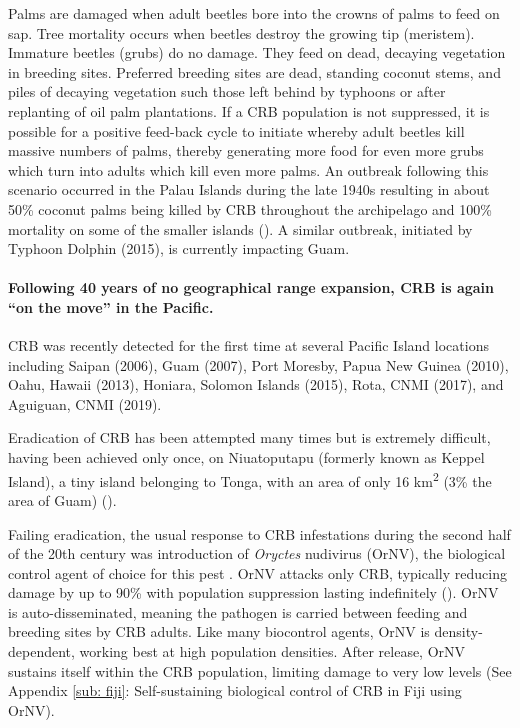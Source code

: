 \documentclass[12pt,letterpaper,english,bibliography=totocnumbered, abstract=on]{scrartcl}
\begin{document}
Palms are damaged when adult beetles bore into the crowns of palms
to feed on sap. Tree mortality occurs when beetles destroy the growing
tip (meristem). Immature beetles (grubs) do no damage. They feed on
dead, decaying vegetation in breeding sites. Preferred breeding sites
are dead, standing coconut stems, and piles of decaying vegetation
such those left behind by typhoons or after replanting of oil palm
plantations. If a CRB population is not suppressed, it is possible
for a positive feed-back cycle to initiate whereby adult beetles kill
massive numbers of palms, thereby generating more food for even more
grubs which turn into adults which kill even more palms. An outbreak
following this scenario occurred in the Palau Islands during the late
1940s resulting in about 50\% coconut palms being killed by CRB throughout
the archipelago and 100\% mortality on some of the smaller islands
(\cite{gressitt_coconut_1953}). A similar outbreak, initiated by Typhoon Dolphin (2015), is currently impacting Guam.

\paragraph{Following 40 years of no geographical range expansion, CRB is again
``on the move'' in the Pacific.}

CRB was recently detected for the first time at several Pacific Island
locations including Saipan (2006), Guam (2007), Port Moresby, Papua
New Guinea (2010), Oahu, Hawaii (2013), Honiara, Solomon Islands
(2015), Rota, CNMI (2017), and Aguiguan, CNMI (2019). 

Eradication of CRB has been attempted many times but is extremely
difficult, having been achieved only once, on Niuatoputapu (formerly
known as Keppel Island), a tiny island belonging to Tonga, with an
area of only 16 km\textsuperscript{2} (3\% the area of Guam) (\cite{catley_coconut_1969}).

Failing eradication, the usual response to CRB infestations during
the second half of the 20th century was introduction of \emph{Oryctes}
nudivirus (OrNV), the biological control agent of choice for this
pest \cite{jackson_use_2009-1} . OrNV attacks only CRB, typically
reducing damage by up to 90\% with population suppression lasting
indefinitely (\cite{bedford_g._o._long-term_2013}). OrNV is auto-disseminated,
meaning the pathogen is carried between feeding and breeding sites
by CRB adults. Like many biocontrol agents, OrNV is density-dependent,
working best at high population densities. After release, OrNV sustains itself within the 
CRB population, limiting damage to very low levels (See Appendix \ref{sub: fiji}: Self-sustaining biological control of CRB in Fiji using OrNV). 
\end{document}
